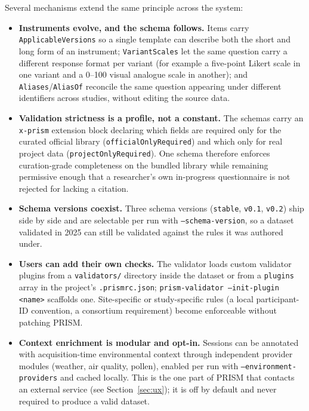 \documentclass[10pt]{article}
\begin{document}
Several mechanisms extend the same principle across the system:

\begin{itemize}
  \item \textbf{Instruments evolve, and the schema follows.} Items carry
  \texttt{ApplicableVersions} so a single template can describe both the
  short and long form of an instrument; \texttt{VariantScales} let the same
  question carry a different response format per variant (for example a
  five-point Likert scale in one variant and a 0--100 visual analogue scale
  in another); and \texttt{Aliases}/\texttt{AliasOf} reconcile the same
  question appearing under different identifiers across studies, without
  editing the source data.

  \item \textbf{Validation strictness is a profile, not a constant.} The
  schemas carry an \texttt{x-prism} extension block declaring which fields
  are required only for the curated official library
  (\texttt{officialOnlyRequired}) and which only for real project data
  (\texttt{projectOnlyRequired}). One schema therefore enforces
  curation-grade completeness on the bundled library while remaining
  permissive enough that a researcher's own in-progress questionnaire is not
  rejected for lacking a citation.

  \item \textbf{Schema versions coexist.} Three schema versions
  (\texttt{stable}, \texttt{v0.1}, \texttt{v0.2}) ship side by side and are
  selectable per run with \texttt{--schema-version}, so a dataset validated
  in 2025 can still be validated against the rules it was authored under.

  \item \textbf{Users can add their own checks.} The validator loads custom
  validator plugins from a \texttt{validators/} directory inside the dataset
  or from a \texttt{plugins} array in the project's
  \texttt{.prismrc.json}; \texttt{prism-validator --init-plugin <name>}
  scaffolds one. Site-specific or study-specific rules (a local
  participant-ID convention, a consortium requirement) become enforceable
  without patching PRISM.

  \item \textbf{Context enrichment is modular and opt-in.} Sessions can be
  annotated with acquisition-time environmental context through independent
  provider modules (weather, air quality, pollen), enabled per run with
  \texttt{--environment-providers} and cached locally. This is the one part
  of PRISM that contacts an external service (see
  Section~\ref{sec:ux}); it is off by default and never required to produce
  a valid dataset.
\end{itemize}
\end{document}
